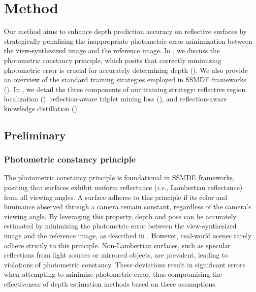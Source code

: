 \section{Method}
\label{sec:method}
Our method aims to enhance depth prediction accuracy on reflective surfaces by strategically penalizing the inappropriate photometric error minimization between the view-synthesized image and the reference image.
In , we discuss the photometric constancy principle, which posits that correctly minimizing photometric error is crucial for accurately determining depth ().
We also provide an overview of the standard training strategies employed in SSMDE frameworks ().
In , we detail the three components of our training strategy: reflective region localization (), reflection-aware triplet mining loss (), and reflection-aware knowledge distillation ().

\subsection{Preliminary}
\label{sec:preliminary}

\subsubsection{Photometric constancy principle}
\label{sec:photometric_constancy_principle}
The photometric constancy principle is foundational in SSMDE frameworks, positing that surfaces exhibit uniform reflectance (\textit{i.e.}, Lambertian reflectance) from all viewing angles.
A surface adheres to this principle if its color and luminance observed through a camera remain constant, regardless of the camera's viewing angle.
By leveraging this property, depth and pose can be accurately estimated by minimizing the photometric error between the view-synthesized image and the reference image, as described in .
However, real-world scenes rarely adhere strictly to this principle.
Non-Lambertian surfaces, such as specular reflections from light sources or mirrored objects, are prevalent, leading to violations of photometric constancy.
These deviations result in significant errors when attempting to minimize photometric error, thus compromising the effectiveness of depth estimation methods based on these assumptions.

